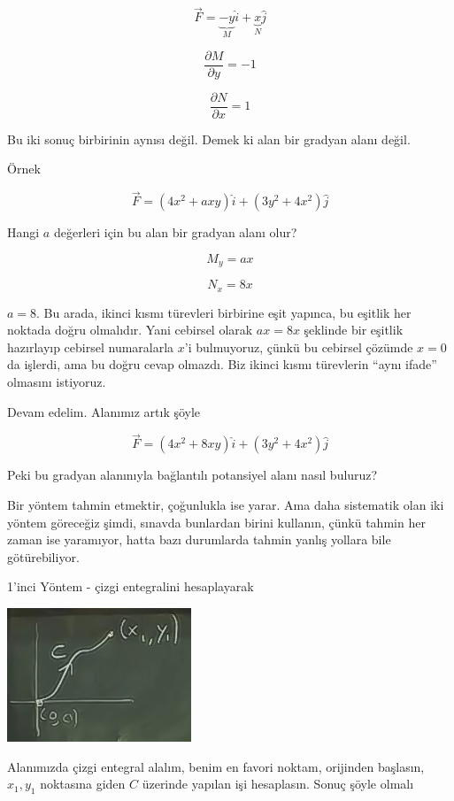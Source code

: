 \documentclass[12pt,fleqn]{article}\usepackage{../../common}
\begin{document}
$$ \vec{F} = \underbrace{-y}_{M}\hat{i} + 
\underbrace{x}_{N}\hat{j} 
$$

$$ \frac{\partial M}{\partial y} = -1 $$

$$ \frac{\partial N}{\partial x} = 1 $$

Bu iki sonuç birbirinin aynısı değil. Demek ki alan bir gradyan alanı
değil. 

Örnek

$$ \vec{F} = (4x^2 + axy)\hat{i} + (3y^2 + 4x^2)\hat{j} $$

Hangi $a$ değerleri için bu alan bir gradyan alanı olur? 

$$ M_y = ax $$

$$ N_x = 8x $$

$a=8$. Bu arada, ikinci kısmı türevleri birbirine eşit yapınca, bu eşitlik her
noktada doğru olmalıdır. Yani cebirsel olarak $ax = 8x$ şeklinde bir eşitlik
hazırlayıp cebirsel numaralarla $x$'i bulmuyoruz, çünkü bu cebirsel çözümde
$x=0$ da işlerdi, ama bu doğru cevap olmazdı. Biz ikinci kısmı türevlerin ``aynı
ifade'' olmasını istiyoruz.

Devam edelim. Alanımız artık şöyle

$$ \vec{F} = (4x^2 + 8xy)\hat{i} + (3y^2 + 4x^2)\hat{j} $$

Peki bu gradyan alanınıyla bağlantılı potansiyel alanı nasıl buluruz? 

Bir yöntem tahmin etmektir, çoğunlukla ise yarar. Ama daha sistematik olan iki
yöntem göreceğiz şimdi, sınavda bunlardan birini kullanın, çünkü tahmin her
zaman ise yaramıyor, hatta bazı durumlarda tahmin yanlış yollara bile
götürebiliyor.

1'inci Yöntem - çizgi entegralini hesaplayarak 

\begin{center}

\includegraphics[height=4cm]{21_2.png}

\end{center}
Alanımızda çizgi entegral alalım, benim en favori noktam, orijinden
başlasın, $x_1,y_1$ noktasına giden $C$ üzerinde yapılan işi hesaplasın.
Sonuç şöyle olmalı
\end{document}
